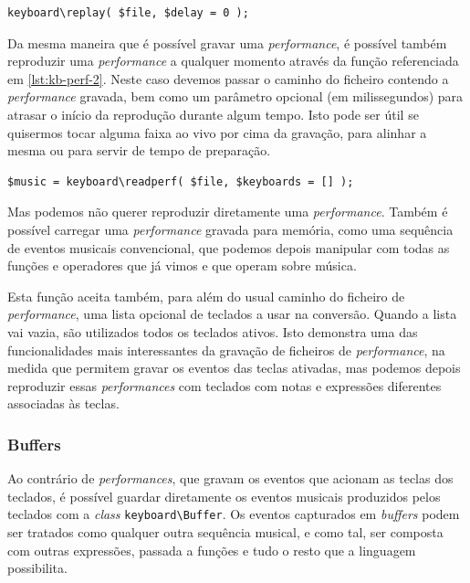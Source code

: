 \begin{lstlisting}[caption={Reprodução de uma \textit{performance}},label={lst:kb-perf-2}]
keyboard\replay( $file, $delay = 0 );
\end{lstlisting}

Da mesma maneira que é possível gravar uma \textit{performance}, é possível também reproduzir uma \textit{performance} a qualquer momento através da função referenciada em \ref{lst:kb-perf-2}. Neste caso devemos passar o caminho do ficheiro contendo a \textit{performance} gravada, bem como um parâmetro opcional (em milissegundos) para atrasar o início da reprodução durante algum tempo. Isto pode ser útil se quisermos tocar alguma faixa ao vivo por cima da gravação, para alinhar a mesma ou para servir de tempo de preparação.

\begin{lstlisting}[caption={Conversão de uma \textit{performance} numa sequência de eventos músicais},label={lst:kb-perf-3}]
$music = keyboard\readperf( $file, $keyboards = [] );
\end{lstlisting}

Mas podemos não querer reproduzir diretamente uma \textit{performance}. Também é possível carregar uma \textit{performance} gravada para memória, como uma sequência de eventos musicais convencional, que podemos depois manipular com todas as funções e operadores que já vimos e que operam sobre música.

Esta função aceita também, para além do usual caminho do ficheiro de \textit{performance}, uma lista opcional de teclados a usar na conversão. Quando a lista vai vazia, são utilizados todos os teclados ativos. Isto demonstra uma das funcionalidades mais interessantes da gravação de ficheiros de \textit{performance}, na medida que permitem gravar os eventos das teclas ativadas, mas podemos depois reproduzir essas \textit{performances} com teclados com notas e expressões diferentes associadas às teclas.



\subsubsection{Buffers}
Ao contrário de \textit{performances}, que gravam os eventos que acionam as teclas dos teclados, é possível guardar diretamente os eventos musicais produzidos pelos teclados com a \textit{class} \texttt{keyboard\textbackslash{}Buffer}. Os eventos capturados em \textit{buffers} podem ser tratados como qualquer outra sequência musical, e como tal, ser composta com outras expressões, passada a funções e tudo o resto que a linguagem possibilita. 

